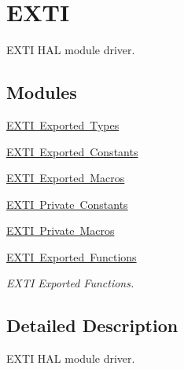 \hypertarget{group___e_x_t_i}{}\section{E\+X\+TI}
\label{group___e_x_t_i}


E\+X\+TI H\+AL module driver.  


\subsection*{Modules}
\begin{DoxyCompactItemize}
\item 
\mbox{\hyperlink{group___e_x_t_i___exported___types}{E\+X\+T\+I Exported Types}}
\item 
\mbox{\hyperlink{group___e_x_t_i___exported___constants}{E\+X\+T\+I Exported Constants}}
\item 
\mbox{\hyperlink{group___e_x_t_i___exported___macros}{E\+X\+T\+I Exported Macros}}
\item 
\mbox{\hyperlink{group___e_x_t_i___private___constants}{E\+X\+T\+I Private Constants}}
\item 
\mbox{\hyperlink{group___e_x_t_i___private___macros}{E\+X\+T\+I Private Macros}}
\item 
\mbox{\hyperlink{group___e_x_t_i___exported___functions}{E\+X\+T\+I Exported Functions}}
\begin{DoxyCompactList}\small\item\em E\+X\+TI Exported Functions. \end{DoxyCompactList}\end{DoxyCompactItemize}


\subsection{Detailed Description}
E\+X\+TI H\+AL module driver. 

